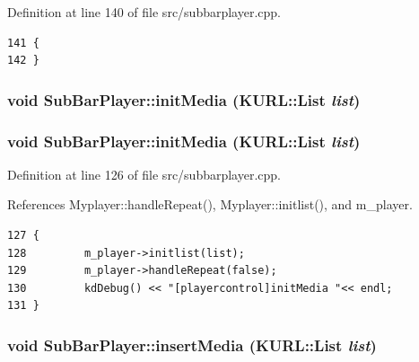 Definition at line 140 of file src/subbarplayer.cpp.



\footnotesize\begin{verbatim}141 {
142 }
\end{verbatim}\normalsize 
{}
\subsubsection{\setlength{\rightskip}{0pt plus 5cm}void Sub\-Bar\-Player::init\-Media (KURL::List {\em list})\hspace{0.3cm}{\tt  [slot]}}\label{classSubBarPlayer_SubBarPlayeri31}


\subsubsection{\setlength{\rightskip}{0pt plus 5cm}void Sub\-Bar\-Player::init\-Media (KURL::List {\em list})\hspace{0.3cm}{\tt  [slot]}}\label{classSubBarPlayer_SubBarPlayeri13}




Definition at line 126 of file src/subbarplayer.cpp.

References Myplayer::handle\-Repeat(), Myplayer::initlist(), and m\_\-player.



\footnotesize\begin{verbatim}127 {
128         m_player->initlist(list);
129         m_player->handleRepeat(false);
130         kdDebug() << "[playercontrol]initMedia "<< endl; 
131 }
\end{verbatim}\normalsize 
{}
\subsubsection{\setlength{\rightskip}{0pt plus 5cm}void Sub\-Bar\-Player::insert\-Media (KURL::List {\em list})\hspace{0.3cm}{\tt  [slot]}}\label{classSubBarPlayer_SubBarPlayeri29}


